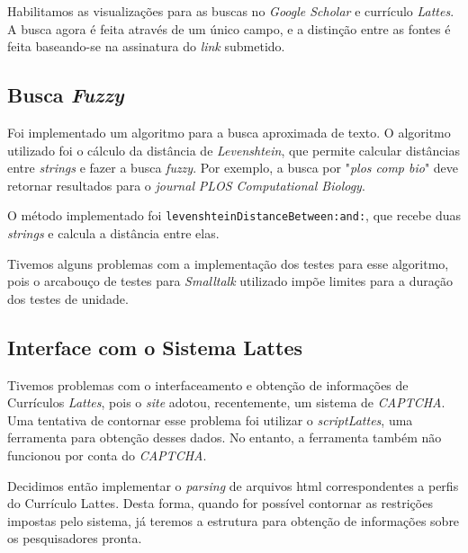 \documentclass[12pt]{article}
\begin{document}
Habilitamos as visualizações para as buscas no \emph{Google Scholar}
e currículo \emph{Lattes}. A busca agora é feita através de um único
campo, e a distinção entre as fontes é feita baseando-se na assinatura
do \emph{link} submetido.

\subsection{Busca \emph{Fuzzy}}

Foi implementado um algoritmo para a busca aproximada de texto.
O algoritmo utilizado foi o cálculo da distância de \emph{Levenshtein},
que permite calcular distâncias entre \emph{strings} e fazer a busca
\emph{fuzzy}. Por exemplo, a busca por "\emph{plos comp bio}" deve retornar
resultados para o \emph{journal} \emph{PLOS Computational Biology}.

O método implementado foi \texttt{levenshteinDistanceBetween:and:},
que recebe duas \emph{strings} e calcula a distância entre elas.

Tivemos alguns problemas com a implementação dos testes para esse algoritmo,
pois o arcabouço de testes para \emph{Smalltalk} utilizado impõe limites
para a duração dos testes de unidade.

\subsection{Interface com o Sistema Lattes}

Tivemos problemas com o interfaceamento e obtenção de informações
de Currículos \emph{Lattes}, pois o \emph{site} adotou, recentemente,
um sistema de \emph{CAPTCHA}. Uma tentativa de contornar esse problema
foi utilizar o \emph{scriptLattes}, uma ferramenta para obtenção desses dados.
No entanto, a ferramenta também não funcionou por conta do \emph{CAPTCHA}.

Decidimos então implementar o \emph{parsing} de arquivos html correspondentes
a perfis do Currículo Lattes. Desta forma, quando for possível contornar as
restrições impostas pelo sistema, já teremos a estrutura para obtenção de 
informações sobre os pesquisadores pronta.
\end{document}
